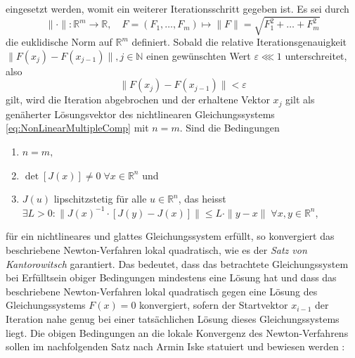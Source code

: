 \documentclass[a4paper,12pt]{article}
\numberwithin{equation}{section}
\begin{document}
\begin{equation}
\end{equation} eingesetzt werden, womit ein weiterer Iterationsschritt gegeben ist. Es sei durch \begin{equation}\label{eq:defeuuklnorm}
\|\cdot\|:\mathbb{R}^m \rightarrow \mathbb{R}, \quad F = (F_1,\dots,F_m) \mapsto \|F\| = \sqrt{F_1^2+\dots+F_m^2}
\end{equation} die euklidische Norm auf $\mathbb{R}^m$ definiert. Sobald die relative Iterationsgenauigkeit $\|F(x_j)-F(x_{j-1})\|, j \in \mathbb{N}$ einen gewünschten Wert $\varepsilon \lll 1$ unterschreitet, also \begin{equation}
\|F(x_j)-F(x_{j-1})\| < \varepsilon
\end{equation} gilt, wird die Iteration abgebrochen und der erhaltene Vektor $x_j$ gilt als genäherter Lösungsvektor des nichtlinearen Gleichungssystems \eqref{eq:NonLinearMultipleComp} mit $n=m$. Sind die Bedingungen \begin{enumerate}
\item $ n = m,$
\item $\det[J(x)] \neq 0 \; \forall x \in \mathbb{R}^n$ und 
\item $J(u)$ lipschitzstetig für alle $u \in \mathbb{R}^n$, das heisst $\exists L > 0 : \|J(x)^{-1}\cdot [J(y)-J(x)]\| \leq L\cdot \|y-x\|\; \forall x,y \in \mathbb{R}^n$,
\end{enumerate} für ein nichtlineares und glattes Gleichungssystem erfüllt, so konvergiert das beschriebene Newton-Verfahren lokal quadratisch, wie es der \textit{Satz von Kantorowitsch} garantiert. Das bedeutet, dass das betrachtete Gleichungssystem bei Erfülltsein obiger Bedingungen mindestens eine Lösung hat und dass das beschriebene Newton-Verfahren lokal quadratisch gegen eine Lösung des Gleichungssystems $F(x) = 0$ konvergiert, sofern der Startvektor $x_{i-1}$ der Iteration nahe genug bei einer tatsächlichen Lösung dieses Gleichungssystems liegt. Die obigen Bedingungen an die lokale Konvergenz des Newton-Verfahrens sollen im nachfolgenden Satz nach Armin Iske statuiert und bewiesen werden \cite[S.113-116]{ArminIske.2015}:
\end{document}
